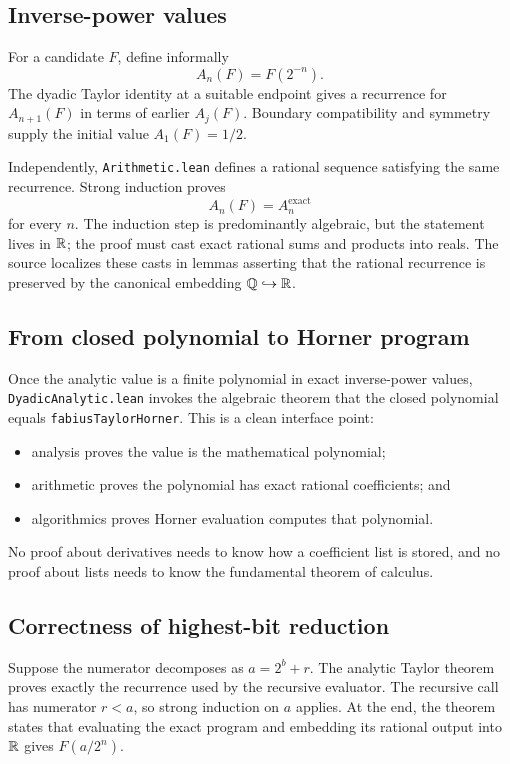 \documentclass[11pt,oneside]{article}
\theoremstyle{definition}
\theoremstyle{remark}
\begin{document}
\subsection{Inverse-power values}
For a candidate \(F\), define informally
\[
  A_n(F)=F(2^{-n}).
\]
The dyadic Taylor identity at a suitable endpoint gives a recurrence for \(A_{n+1}(F)\) in terms of earlier \(A_j(F)\).  Boundary compatibility and symmetry supply the initial value \(A_1(F)=1/2\).

Independently, \nolinkurl{Arithmetic.lean} defines a rational sequence satisfying the same recurrence.  Strong induction proves
\[
  A_n(F)=A_n^{\mathrm{exact}}
\]
for every \(n\).  The induction step is predominantly algebraic, but the statement lives in \(\mathbb{R}\); the proof must cast exact rational sums and products into reals.  The source localizes these casts in lemmas asserting that the rational recurrence is preserved by the canonical embedding \(\mathbb{Q}\hookrightarrow\mathbb{R}\).

\subsection{From closed polynomial to Horner program}
Once the analytic value is a finite polynomial in exact inverse-power values, \nolinkurl{DyadicAnalytic.lean} invokes the algebraic theorem that the closed polynomial equals \nolinkurl{fabiusTaylorHorner}.  This is a clean interface point:
\begin{itemize}
  \item analysis proves the value is the mathematical polynomial;
  \item arithmetic proves the polynomial has exact rational coefficients; and
  \item algorithmics proves Horner evaluation computes that polynomial.
\end{itemize}
No proof about derivatives needs to know how a coefficient list is stored, and no proof about lists needs to know the fundamental theorem of calculus.

\subsection{Correctness of highest-bit reduction}
Suppose the numerator decomposes as \(a=2^b+r\).  The analytic Taylor theorem proves exactly the recurrence used by the recursive evaluator.  The recursive call has numerator \(r<a\), so strong induction on \(a\) applies.  At the end, the theorem states that evaluating the exact program and embedding its rational output into \(\mathbb{R}\) gives \(F(a/2^n)\).
\end{document}
